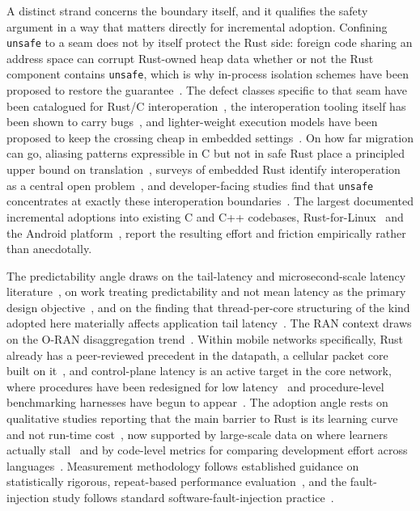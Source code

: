 \documentclass[english,twoside,openright,a4paper,censored,csm,software-track-2020]{HYthesisML}
\begin{document}
A distinct strand concerns the boundary itself, and it qualifies the safety argument in a way
that matters directly for incremental adoption. Confining \texttt{unsafe} to a seam does not by
itself protect the Rust side: foreign code sharing an address space can corrupt Rust-owned heap
data whether or not the Rust component contains \texttt{unsafe}, which is why in-process
isolation schemes have been proposed to restore the
guarantee~\cite{rivera2021galeed,kirth2022pkrusafe}. The defect classes specific to that seam
have been catalogued for Rust/C interoperation~\cite{li2022crosslang}, the interoperation
tooling itself has been shown to carry bugs~\cite{cai2026interop}, and lighter-weight execution
models have been proposed to keep the crossing cheap in embedded
settings~\cite{schuermann2023encapsulated}. On how far migration can go, aliasing patterns
expressible in C but not in safe Rust place a principled upper bound on
translation~\cite{emre2023aliasing}, surveys of embedded Rust identify interoperation as a
central open problem~\cite{sharma2024embedded}, and developer-facing studies find that
\texttt{unsafe} concentrates at exactly these interoperation
boundaries~\cite{mccormack2026unsafe}. The largest documented incremental adoptions into
existing C and C++ codebases, Rust-for-Linux~\cite{li2024rustforlinux} and the Android
platform~\cite{fan2026android}, report the resulting effort and friction empirically rather
than anecdotally.

The predictability angle draws on the tail-latency and
microsecond-scale latency literature~\cite{dean2013tail,barroso2017microseconds,li2014tales},
on work treating predictability and not mean latency as the primary design
objective~\cite{huang2017predictability}, and on the finding that thread-per-core structuring
of the kind adopted here materially affects application tail
latency~\cite{enberg2019threadpercore}. The RAN context draws on the O-RAN disaggregation
trend~\cite{polese2023oran}. Within mobile networks specifically, Rust already has a
peer-reviewed precedent in the datapath, a cellular packet core built on
it~\cite{qazi2017pepc}, and control-plane latency is an active target in the core network,
where procedures have been redesigned for low latency~\cite{liu2023l25gc} and procedure-level
benchmarking harnesses have begun to appear~\cite{park2025ctrlbench}. The adoption angle rests
on qualitative studies reporting that the main barrier to Rust is its learning curve and not
run-time cost~\cite{fulton2021adopting}, now supported by large-scale data on where
learners actually stall~\cite{crichton2024learning} and by code-level metrics for comparing
development effort across languages~\cite{ardito2021verbosity}. Measurement methodology
follows established guidance on statistically rigorous, repeat-based performance
evaluation~\cite{georges2007rigorous}, and the fault-injection study follows standard
software-fault-injection practice~\cite{natella2016fault}.
\end{document}
